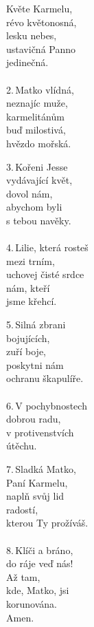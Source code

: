 \begin{translatioMulticol}{4}
Květe Karmelu,\\
révo květonosná,\\
lesku nebes,\\
ustavičná Panno\\
jedinečná.\\
\\
{\color{red}2.}\,Matko vlídná,\\
neznajíc muže,\\
karmelitánům\\
buď milostivá,\\
hvězdo mořská.\columnbreak

{\color{red}3.}\,Kořeni Jesse\\
vydávající květ,\\
dovol nám,\\
abychom byli\\
s tebou navěky.\\
\\
{\color{red}4.}\,Lilie, která rosteš\\
mezi trním,\\
uchovej čisté srdce\\
nám, kteří\\
jsme křehcí.\columnbreak

{\color{red}5.}\,Silná zbrani\\
bojujících,\\
zuří boje,\\
poskytni nám\\
ochranu škapulíře.\\
\\
{\color{red}6.}\,V pochybnostech\\
dobrou radu,\\
v protivenstvích\\
útěchu.\columnbreak

{\color{red}7.}\,Sladká Matko,\\
Paní Karmelu,\\
naplň svůj lid\\
radostí,\\
kterou Ty prožíváš.\\
\\
{\color{red}8.}\,Klíči a bráno,\\
do ráje veď nás!\\
Až tam,\\
kde, Matko, jsi\\
korunována.\\
Amen.
\end{translatioMulticol}
